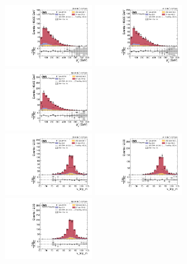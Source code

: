 \begin{figure}[!ht]
  \centering
  \includegraphics[width=0.335\textwidth]{analysis_plots/2016_zv/cr_vjets_l/v_lep_pt.pdf} \hspace{-10pt}
  \includegraphics[width=0.335\textwidth]{analysis_plots/2017_zv/cr_vjets_l/v_lep_pt.pdf} \hspace{-10pt}
  \includegraphics[width=0.335\textwidth]{analysis_plots/2018_zv/cr_vjets_l/v_lep_pt.pdf} \hspace{-10pt} \\
  \includegraphics[width=0.335\textwidth]{analysis_plots/2016_zv/cr_vjets_l/v_lep_m.pdf} \hspace{-10pt}
  \includegraphics[width=0.335\textwidth]{analysis_plots/2017_zv/cr_vjets_l/v_lep_m.pdf} \hspace{-10pt}
  \includegraphics[width=0.335\textwidth]{analysis_plots/2018_zv/cr_vjets_l/v_lep_m.pdf} \hspace{-10pt} \\

\end{figure}
